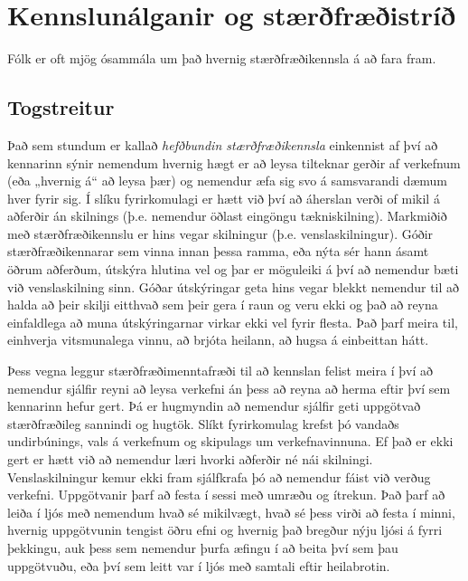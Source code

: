 \documentclass[
  icelandic,
]{book}
\begin{document}
\chapter{Kennslunálganir og stærðfræðistríð}\label{kennslunuxe1lganir-og-stuxe6ruxf0fruxe6uxf0istruxeduxf0}

Fólk er oft mjög ósammála um það hvernig stærðfræðikennsla á að fara fram.

\section{Togstreitur}\label{togstreitur}

Það sem stundum er kallað \emph{hefðbundin stærðfræðikennsla} einkennist af því að kennarinn sýnir nemendum hvernig hægt er að leysa tilteknar gerðir af verkefnum (eða „hvernig á`` að leysa þær) og nemendur æfa sig svo á samsvarandi dæmum hver fyrir sig. Í slíku fyrirkomulagi er hætt við því að áherslan verði of mikil á aðferðir án skilnings (þ.e. nemendur öðlast eingöngu tækniskilning). Markmiðið með stærðfræðikennslu er hins vegar skilningur (þ.e. venslaskilningur). Góðir stærðfræðikennarar sem vinna innan þessa ramma, eða nýta sér hann ásamt öðrum aðferðum, útskýra hlutina vel og þar er möguleiki á því að nemendur bæti við venslaskilning sinn. Góðar útskýringar geta hins vegar blekkt nemendur til að halda að þeir skilji eitthvað sem þeir gera í raun og veru ekki og það að reyna einfaldlega að muna útskýringarnar virkar ekki vel fyrir flesta. Það þarf meira til, einhverja vitsmunalega vinnu, að brjóta heilann, að hugsa á einbeittan hátt.

Þess vegna leggur stærðfræðimenntafræði til að kennslan felist meira í því að nemendur sjálfir reyni að leysa verkefni án þess að reyna að herma eftir því sem kennarinn hefur gert. Þá er hugmyndin að nemendur sjálfir geti uppgötvað stærðfræðileg sannindi og hugtök. Slíkt fyrirkomulag krefst þó vandaðs undirbúnings, vals á verkefnum og skipulags um verkefnavinnuna. Ef það er ekki gert er hætt við að nemendur læri hvorki aðferðir né nái skilningi. Venslaskilningur kemur ekki fram sjálfkrafa þó að nemendur fáist við verðug verkefni. Uppgötvanir þarf að festa í sessi með umræðu og ítrekun. Það þarf að leiða í ljós með nemendum hvað sé mikilvægt, hvað sé þess virði að festa í minni, hvernig uppgötvunin tengist öðru efni og hvernig það bregður nýju ljósi á fyrri þekkingu, auk þess sem nemendur þurfa æfingu í að beita því sem þau uppgötvuðu, eða því sem leitt var í ljós með samtali eftir heilabrotin.
\end{document}
